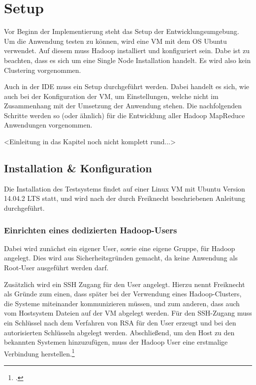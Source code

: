
\chapter{Setup}\label{cha:Setup}
Vor Beginn der Implementierung steht das Setup der Entwicklungsumgebung. Um die Anwendung testen zu können, wird eine \ac{VM} mit dem \ac{OS} Ubuntu verwendet. Auf diesem muss Hadoop installiert und konfiguriert sein. Dabe ist zu beachten, dass es sich um eine Single Node Installation handelt. Es wird also kein Clustering vorgenommen.

Auch in der \ac{IDE} muss ein Setup durchgeführt werden. Dabei handelt es sich, wie auch bei der Konfiguration der \ac{VM}, um Einstellungen, welche nicht im Zusammenhang mit der Umsetzung der Anwendung stehen. Die nachfolgenden Schritte werden so (oder ähnlich) für die Entwicklung aller Hadoop MapReduce Anwendungen vorgenommen.

<Einleitung in das Kapitel noch nicht komplett rund...>

\section{Installation \& Konfiguration}\label{sec:InstallationHadoop}
Die Installation des Testsystems findet auf einer Linux \ac{VM} mit Ubuntu Version 14.04.2 \ac{LTS} statt, und wird nach der durch Freiknecht beschriebenen Anleitung durchgeführt. 

\subsection{Einrichten eines dedizierten Hadoop-Users}
Dabei wird zunächst ein eigener User, sowie eine eigene Gruppe, für Hadoop angelegt. Dies wird aus Sicherheitsgründen gemacht, da keine Anwendung als Root-User ausgeführt werden darf.

Zusätzlich wird ein \ac{SSH} Zugang für den User angelegt. Hierzu nennt Freiknecht als Gründe zum einen, dass später bei der Verwendung eines Hadoop-Clusters, die Systeme miteinander kommunizieren müssen, und zum anderen, dass auch vom Hostsystem Dateien auf der \ac{VM} abgelegt werden. Für den \ac{SSH}-Zugang muss ein Schlüssel nach dem Verfahren von \ac{RSA} für den User erzeugt und bei den autorisierten Schlüsseln abgelegt werden. Abschließend, um den Host zu den bekannten Systemen hinzuzufügen, muss der Hadoop User eine erstmalige Verbindung herstellen.\footcite[Vgl.][S. 30 f.]{Freiknecht.2014}

